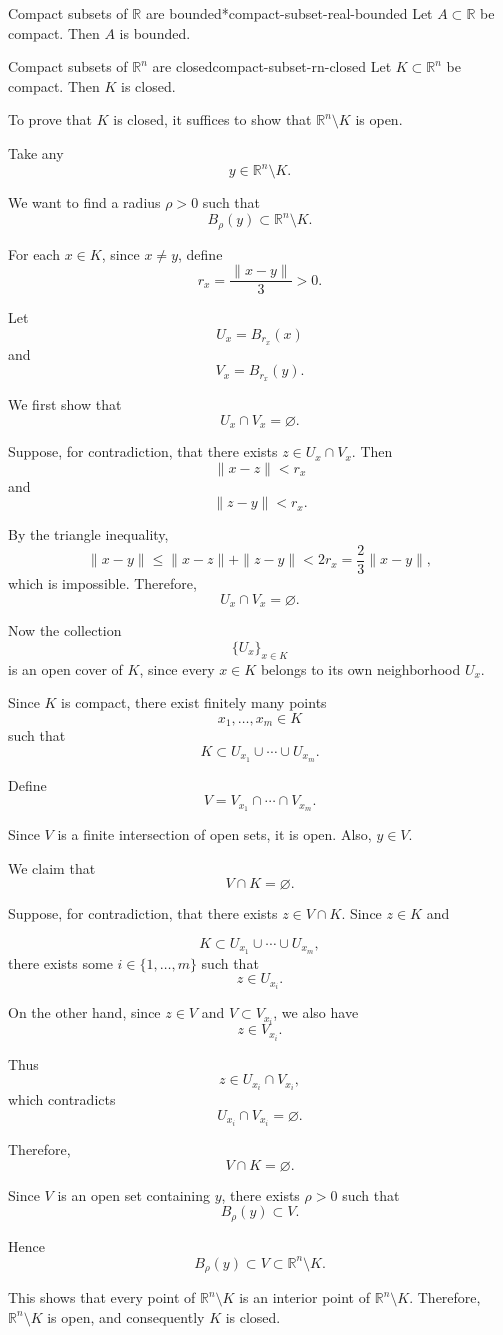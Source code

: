 \documentclass[UTF8,12pt,a4paper]{ctexart}
\makeatletter
\numberwithin{equation}{section}
\newcommand{\currentProofColor}{black}
\renewenvironment{proof}[1][Proof]{%
  \par
  \begingroup
  \edef\proofQEDColor{\currentProofColor}%
  \renewcommand{\qedsymbol}{\textcolor{\proofQEDColor}{$\blacksquare$}}%
  \pushQED{\qed}%
  \normalfont
  \topsep6\p@\@plus6\p@\relax
  \trivlist
  \item[\hskip\labelsep\bfseries\itshape #1\@addpunct{.}]\ignorespaces
}{%
  \popQED
  \endtrivlist
  \@endpefalse
  \endgroup
}
\makeatother
\begin{document}
\begin{cor}{Compact subsets of $\mathbb{R}$ are bounded*}{compact-subset-real-bounded}
Let $A\subset\mathbb{R}$ be compact. Then $A$ is bounded.
\end{cor}

\begin{prop}{Compact subsets of $\mathbb{R}^n$ are closed}{compact-subset-rn-closed}
Let $K\subset\mathbb{R}^n$ be compact. Then $K$ is closed.
\end{prop}

\begin{proof}
To prove that $K$ is closed, it suffices to show that $\mathbb{R}^n\setminus K$ is open.

Take any
$$
y\in \mathbb{R}^n\setminus K.
$$

We want to find a radius $\rho>0$ such that
$$
B_\rho(y)\subset \mathbb{R}^n\setminus K.
$$

For each $x\in K$, since $x\neq y$, define
$$
r_x=\frac{\|x-y\|}{3}>0.
$$

Let
$$
U_x=B_{r_x}(x)
$$
and
$$
V_x=B_{r_x}(y).
$$

We first show that
$$
U_x\cap V_x=\varnothing.
$$

Suppose, for contradiction, that there exists $z\in U_x\cap V_x$. Then
$$
\|x-z\|<r_x
$$
and
$$
\|z-y\|<r_x.
$$

By the triangle inequality,
$$
\|x-y\|\le \|x-z\|+\|z-y\|<2r_x=\frac{2}{3}\|x-y\|,
$$
which is impossible. Therefore,
$$
U_x\cap V_x=\varnothing.
$$

Now the collection
$$
\{U_x\}_{x\in K}
$$
is an open cover of $K$, since every $x\in K$ belongs to its own neighborhood $U_x$.

Since $K$ is compact, there exist finitely many points
$$
x_1,\dots,x_m\in K
$$
such that
$$
K\subset U_{x_1}\cup\cdots\cup U_{x_m}.
$$

Define
$$
V=V_{x_1}\cap\cdots\cap V_{x_m}.
$$

Since $V$ is a finite intersection of open sets, it is open. Also, $y\in V$.

We claim that
$$
V\cap K=\varnothing.
$$

Suppose, for contradiction, that there exists $z\in V\cap K$. Since $z\in K$ and

$$
K\subset U_{x_1}\cup\cdots\cup U_{x_m},
$$
there exists some $i\in\{1,\dots,m\}$ such that
$$
z\in U_{x_i}.
$$

On the other hand, since $z\in V$ and $V\subset V_{x_i}$, we also have
$$
z\in V_{x_i}.
$$

Thus
$$
z\in U_{x_i}\cap V_{x_i},
$$
which contradicts
$$
U_{x_i}\cap V_{x_i}=\varnothing.
$$

Therefore,
$$
V\cap K=\varnothing.
$$

Since $V$ is an open set containing $y$, there exists $\rho>0$ such that
$$
B_\rho(y)\subset V.
$$

Hence
$$
B_\rho(y)\subset V\subset \mathbb{R}^n\setminus K.
$$

This shows that every point of $\mathbb{R}^n\setminus K$ is an interior point of $\mathbb{R}^n\setminus K$. Therefore, $\mathbb{R}^n\setminus K$ is open, and consequently $K$ is closed.
\end{proof}
\end{document}
